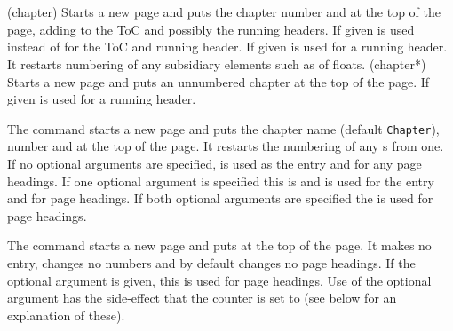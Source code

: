 \begin{syntax}
\cmd{\chapter} \\
\cmd{\chapter*} \\
\end{syntax}
\glossary(chapter)%
  {}
  {Starts a new page and puts the chapter number and 
   at the top of the page, adding  to the ToC and possibly
   the running headers. If given 
   is used instead of  for the ToC and running header. If given
    is used for a running header.
   It restarts numbering of any subsidiary elements
   such as  of floats.}
\glossary(chapter*)%
  {}
  {Starts a new page and puts an unnumbered chapter 
   at the top of the page. If given  is used for a
   running header.}

The \cmd{\chapter} command starts a new page and puts
the chapter name (default \texttt{Chapter}), number and 
at the top of the page. It restarts the numbering of any \cmd{\section}s
from one. If no optional arguments are specified, 
is used as the \toc{} entry and for any page headings. If one optional
argument is specified this is  and is used for the
\toc{} entry and for page headings. If both optional arguments
are specified the  is used for page headings.

The \cmd{\chapter*} command starts a new page and puts
 at the top of the page. It makes no \toc{} entry,
changes no numbers and by default changes no page headings.
If the optional  argument is given, this is used
for page headings. Use of the optional argument has the side-effect
that the  counter is set to  (see below
for an explanation of these).

